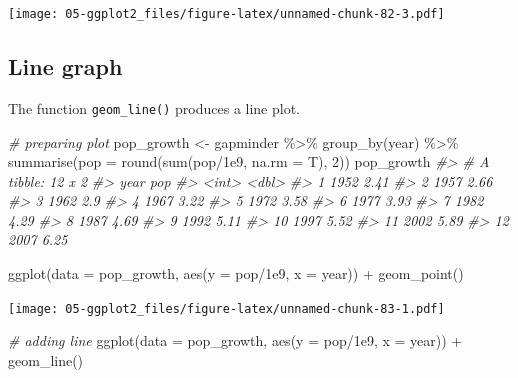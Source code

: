 \documentclass[
]{book}
\newenvironment{Shaded}{\begin{snugshade}}{\end{snugshade}}
\newcommand{\AttributeTok}[1]{\textcolor[rgb]{0.77,0.63,0.00}{#1}}
\newcommand{\CommentTok}[1]{\textcolor[rgb]{0.56,0.35,0.01}{\textit{#1}}}
\newcommand{\DecValTok}[1]{\textcolor[rgb]{0.00,0.00,0.81}{#1}}
\newcommand{\FloatTok}[1]{\textcolor[rgb]{0.00,0.00,0.81}{#1}}
\newcommand{\FunctionTok}[1]{\textcolor[rgb]{0.00,0.00,0.00}{#1}}
\newcommand{\NormalTok}[1]{#1}
\newcommand{\OtherTok}[1]{\textcolor[rgb]{0.56,0.35,0.01}{#1}}
\newcommand{\SpecialCharTok}[1]{\textcolor[rgb]{0.00,0.00,0.00}{#1}}
\begin{document}
\texttt{[image: 05-ggplot2\_files/figure-latex/unnamed-chunk-82-3.pdf]}

\hypertarget{line-graph}{%
\subsection{Line graph}\label{line-graph}}

The function \texttt{geom\_line()} produces a line plot.

\begin{Shaded}
\begin{Highlighting}[]
\CommentTok{\# preparing plot}
\NormalTok{pop\_growth }\OtherTok{\textless{}{-}}
\NormalTok{gapminder }\SpecialCharTok{\%\textgreater{}\%}
\FunctionTok{group\_by}\NormalTok{(year) }\SpecialCharTok{\%\textgreater{}\%}
\FunctionTok{summarise}\NormalTok{(}\AttributeTok{pop =} \FunctionTok{round}\NormalTok{(}\FunctionTok{sum}\NormalTok{(pop}\SpecialCharTok{/}\FloatTok{1e9}\NormalTok{, }\AttributeTok{na.rm =}\NormalTok{ T), }\DecValTok{2}\NormalTok{))}
\NormalTok{pop\_growth}
\CommentTok{\#\textgreater{} \# A tibble: 12 x 2}
\CommentTok{\#\textgreater{}     year   pop}
\CommentTok{\#\textgreater{}    \textless{}int\textgreater{} \textless{}dbl\textgreater{}}
\CommentTok{\#\textgreater{}  1  1952  2.41}
\CommentTok{\#\textgreater{}  2  1957  2.66}
\CommentTok{\#\textgreater{}  3  1962  2.9 }
\CommentTok{\#\textgreater{}  4  1967  3.22}
\CommentTok{\#\textgreater{}  5  1972  3.58}
\CommentTok{\#\textgreater{}  6  1977  3.93}
\CommentTok{\#\textgreater{}  7  1982  4.29}
\CommentTok{\#\textgreater{}  8  1987  4.69}
\CommentTok{\#\textgreater{}  9  1992  5.11}
\CommentTok{\#\textgreater{} 10  1997  5.52}
\CommentTok{\#\textgreater{} 11  2002  5.89}
\CommentTok{\#\textgreater{} 12  2007  6.25}

\FunctionTok{ggplot}\NormalTok{(}\AttributeTok{data =}\NormalTok{ pop\_growth, }\FunctionTok{aes}\NormalTok{(}\AttributeTok{y =}\NormalTok{ pop}\SpecialCharTok{/}\FloatTok{1e9}\NormalTok{, }\AttributeTok{x =}\NormalTok{ year)) }\SpecialCharTok{+} 
  \FunctionTok{geom\_point}\NormalTok{()}
\end{Highlighting}
\end{Shaded}

\texttt{[image: 05-ggplot2\_files/figure-latex/unnamed-chunk-83-1.pdf]}

\begin{Shaded}
\begin{Highlighting}[]


\CommentTok{\# adding line}
\FunctionTok{ggplot}\NormalTok{(}\AttributeTok{data =}\NormalTok{ pop\_growth, }\FunctionTok{aes}\NormalTok{(}\AttributeTok{y =}\NormalTok{ pop}\SpecialCharTok{/}\FloatTok{1e9}\NormalTok{, }\AttributeTok{x =}\NormalTok{ year)) }\SpecialCharTok{+} 
  \FunctionTok{geom\_line}\NormalTok{()}
\end{Highlighting}
\end{Shaded}
\end{document}
